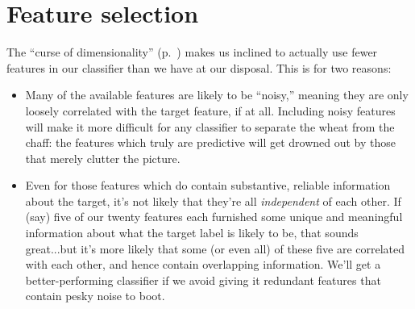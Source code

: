 
%
%
%
%
%
%
%
%
%
%
%
%
%
%
%
%
%
%
%
%


\chapter{Feature selection}

The ``curse of dimensionality'' (p.~\pageref{sec:curse}) makes us inclined to
actually use fewer features in our classifier than we have at our disposal.
This is for two reasons:

\begin{itemize}
\itemsep.1em
\item Many of the available features are likely to be ``noisy,'' meaning they
are only loosely correlated with the target feature, if at all. Including
noisy features will make it more difficult for any classifier to separate the
wheat from the chaff: the features which truly are predictive will get drowned
out by those that merely clutter the picture.

\item Even for those features which do contain substantive, reliable
information about the target, it's not likely that they're all
\textit{independent} of each other. If (say) five of our twenty features each
furnished some unique and meaningful information about what the target label
is likely to be, that sounds great...but it's more likely that some (or even
all) of these five are correlated with each other, and hence contain
overlapping information. We'll get a better-performing classifier if we
avoid giving it redundant features that contain pesky noise to boot.

\end{itemize}

